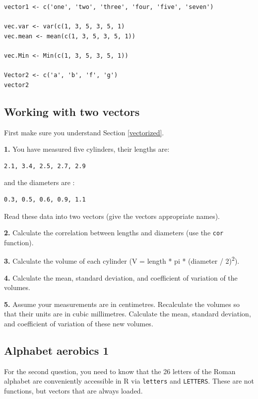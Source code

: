 \documentclass[]{book}
\begin{document}
\begin{verbatim}
vector1 <- c('one', 'two', 'three', 'four, 'five', 'seven')

vec.var <- var(c(1, 3, 5, 3, 5, 1)
vec.mean <- mean(c(1, 3, 5, 3, 5, 1))

vec.Min <- Min(c(1, 3, 5, 3, 5, 1))

Vector2 <- c('a', 'b', 'f', 'g')
vector2
\end{verbatim}

\hypertarget{working-with-two-vectors}{%
\subsection{Working with two vectors}\label{working-with-two-vectors}}

First make sure you understand Section \ref{vectorized}.

\textbf{1.} You have measured five cylinders, their lengths are:

\begin{verbatim}
2.1, 3.4, 2.5, 2.7, 2.9
\end{verbatim}

and the diameters are :

\begin{verbatim}
0.3, 0.5, 0.6, 0.9, 1.1
\end{verbatim}

Read these data into two vectors (give the vectors appropriate names).

\textbf{2.} Calculate the correlation between lengths and diameters (use the \texttt{cor} function).

\textbf{3.} Calculate the volume of each cylinder (V = length * pi * (diameter / 2)\textsuperscript{2}).

\textbf{4.} Calculate the mean, standard deviation, and coefficient of variation of the volumes.

\textbf{5.} Assume your measurements are in centimetres. Recalculate the volumes so that their units are in cubic millimetres. Calculate the mean, standard deviation, and coefficient of variation of these new volumes.

\hypertarget{alphabet-aerobics-1}{%
\subsection{Alphabet aerobics 1}\label{alphabet-aerobics-1}}

For the second question, you need to know that the 26 letters of the Roman alphabet are conveniently accessible in R via \texttt{letters} and \texttt{LETTERS}. These are not functions, but vectors that are always loaded.
\end{document}
